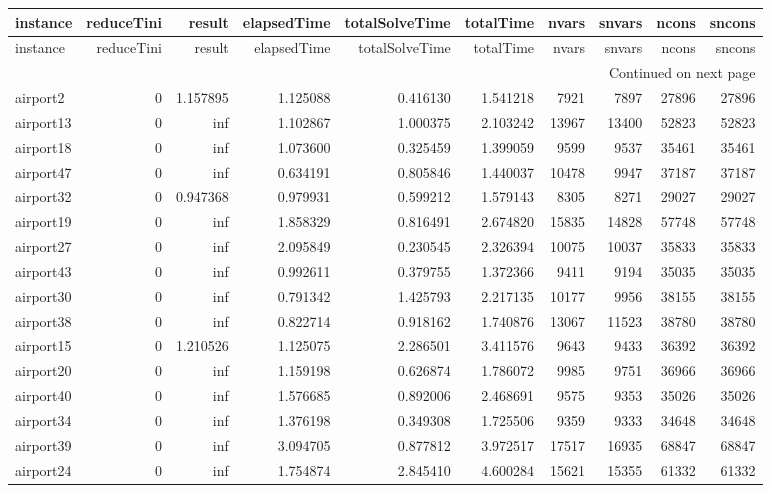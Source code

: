 \begin{longtable}{|l|r|r|r|r|r|r|r|r|r|}
\toprule
instance & reduceTini & result & elapsedTime & totalSolveTime & totalTime & nvars & snvars & ncons & sncons \\
\midrule
\endfirsthead
\toprule
instance & reduceTini & result & elapsedTime & totalSolveTime & totalTime & nvars & snvars & ncons & sncons \\
\midrule
\endhead
\midrule
\multicolumn{10}{r}{Continued on next page} \\
\midrule
\endfoot
\bottomrule
\endlastfoot
airport2 & 0 & 1.157895 & 1.125088 & 0.416130 & 1.541218 & 7921 & 7897 & 27896 & 27896 \\
airport13 & 0 & inf & 1.102867 & 1.000375 & 2.103242 & 13967 & 13400 & 52823 & 52823 \\
airport18 & 0 & inf & 1.073600 & 0.325459 & 1.399059 & 9599 & 9537 & 35461 & 35461 \\
airport47 & 0 & inf & 0.634191 & 0.805846 & 1.440037 & 10478 & 9947 & 37187 & 37187 \\
airport32 & 0 & 0.947368 & 0.979931 & 0.599212 & 1.579143 & 8305 & 8271 & 29027 & 29027 \\
airport19 & 0 & inf & 1.858329 & 0.816491 & 2.674820 & 15835 & 14828 & 57748 & 57748 \\
airport27 & 0 & inf & 2.095849 & 0.230545 & 2.326394 & 10075 & 10037 & 35833 & 35833 \\
airport43 & 0 & inf & 0.992611 & 0.379755 & 1.372366 & 9411 & 9194 & 35035 & 35035 \\
airport30 & 0 & inf & 0.791342 & 1.425793 & 2.217135 & 10177 & 9956 & 38155 & 38155 \\
airport38 & 0 & inf & 0.822714 & 0.918162 & 1.740876 & 13067 & 11523 & 38780 & 38780 \\
airport15 & 0 & 1.210526 & 1.125075 & 2.286501 & 3.411576 & 9643 & 9433 & 36392 & 36392 \\
airport20 & 0 & inf & 1.159198 & 0.626874 & 1.786072 & 9985 & 9751 & 36966 & 36966 \\
airport40 & 0 & inf & 1.576685 & 0.892006 & 2.468691 & 9575 & 9353 & 35026 & 35026 \\
airport34 & 0 & inf & 1.376198 & 0.349308 & 1.725506 & 9359 & 9333 & 34648 & 34648 \\
airport39 & 0 & inf & 3.094705 & 0.877812 & 3.972517 & 17517 & 16935 & 68847 & 68847 \\
airport24 & 0 & inf & 1.754874 & 2.845410 & 4.600284 & 15621 & 15355 & 61332 & 61332 \\

\end{longtable}
